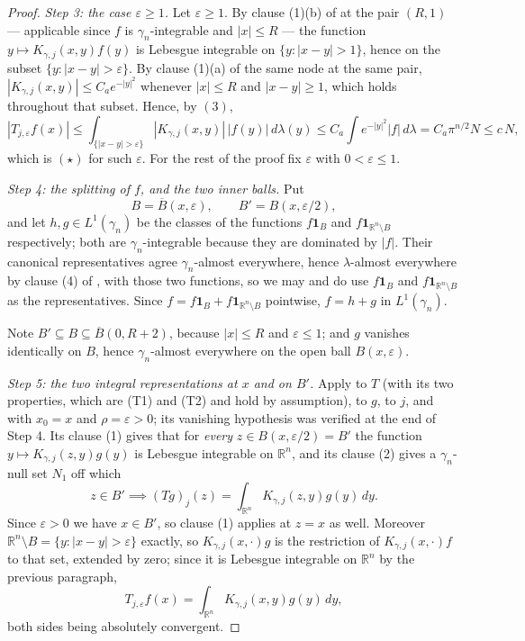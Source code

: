 \begin{proof}
\emph{Step 3: the case $\varepsilon \geq 1$.}
Let $\varepsilon \geq 1$.  By clause (1)(b) of
 at the pair $(R,1)$ --- applicable since
$f$ is $\gamma_n$-integrable and $|x| \leq R$ --- the function
$y \mapsto K_{\gamma,j}(x,y)f(y)$ is Lebesgue integrable on
$\{y : |x-y| > 1\}$, hence on the subset $\{y : |x-y| > \varepsilon\}$.  By
clause (1)(a) of the same node at the same pair, $|K_{\gamma,j}(x,y)| \leq
C_ae^{-|y|^2}$ whenever $|x| \leq R$ and $|x-y| \geq 1$, which holds throughout
that subset.  Hence, by $(3)$,
\[
  |T_{j,\varepsilon}f(x)|
    \leq \int_{\{|x-y|>\varepsilon\}}|K_{\gamma,j}(x,y)|\,|f(y)|\,d\lambda(y)
    \leq C_a\int e^{-|y|^2}|f|\,d\lambda
    = C_a\pi^{n/2}N \leq c\,N ,
\]
which is $(\star)$ for such $\varepsilon$.  For the rest of the proof fix
$\varepsilon$ with $0 < \varepsilon \leq 1$.

\emph{Step 4: the splitting of $f$, and the two inner balls.}
Put
\[
  B = \overline B(x,\varepsilon), \qquad B' = B(x,\varepsilon/2),
\]
and let $h, g \in L^1(\gamma_n)$ be the classes of the functions
$f\mathbf 1_{B}$ and $f\mathbf 1_{\mathbb{R}^n\setminus B}$ respectively; both
are $\gamma_n$-integrable because they are dominated by $|f|$.  Their
canonical representatives agree $\gamma_n$-almost everywhere, hence
$\lambda$-almost everywhere by clause (4) of
, with those two functions, so we may and
do use $f\mathbf 1_B$ and $f\mathbf 1_{\mathbb{R}^n\setminus B}$ as the
representatives.  Since $f = f\mathbf 1_B + f\mathbf 1_{\mathbb{R}^n\setminus B}$
pointwise, $f = h + g$ in $L^1(\gamma_n)$.

Note $B' \subseteq B \subseteq \overline B(0,R+2)$, because $|x| \leq R$ and
$\varepsilon \leq 1$; and $g$ vanishes identically on $B$, hence
$\gamma_n$-almost everywhere on the open ball $B(x,\varepsilon)$.

\emph{Step 5: the two integral representations at $x$ and on $B'$.}
Apply  to $T$ (with its two properties, which
are (T1) and (T2) and hold by assumption), to $g$, to $j$, and with
$x_0 = x$ and $\rho = \varepsilon > 0$; its vanishing hypothesis was verified at
the end of Step 4.  Its clause (1) gives that for \emph{every}
$z \in B(x,\varepsilon/2) = B'$ the function
$y \mapsto K_{\gamma,j}(z,y)g(y)$ is Lebesgue integrable on $\mathbb{R}^n$, and
its clause (2) gives a $\gamma_n$-null set $N_1$ off which
\begin{equation*}
  z \in B' \implies (Tg)_j(z) = \int_{\mathbb{R}^n}K_{\gamma,j}(z,y)g(y)\,dy .
  \tag{5}
\end{equation*}
Since $\varepsilon > 0$ we have $x \in B'$, so clause (1) applies at $z = x$ as
well.  Moreover $\mathbb{R}^n\setminus B = \{y : |x-y| > \varepsilon\}$ exactly, so
$K_{\gamma,j}(x,\cdot)g$ is the restriction of $K_{\gamma,j}(x,\cdot)f$ to that
set, extended by zero; since it is Lebesgue integrable on $\mathbb{R}^n$ by the
previous paragraph,
\begin{equation*}
  T_{j,\varepsilon}f(x) = \int_{\mathbb{R}^n}K_{\gamma,j}(x,y)g(y)\,dy , \tag{6}
\end{equation*}
both sides being absolutely convergent.


\end{proof}

